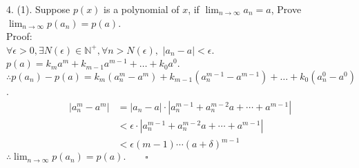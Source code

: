 4. (1). Suppose $ p(x) $ is a polynomial of $ x $, if $ \lim_{n\rightarrow\infty} a_n = a $, Prove $ \lim_{n\rightarrow\infty} p(a_n) = p(a) $.\\

Proof:\\
$ \forall \epsilon>0, \exists N(\epsilon) \in \mathbb{N}^+, \forall n>N(\epsilon), $
$ |a_n-a| <\epsilon $.\\
$ p(a) = k_{m}a^{m} + k_{m-1}a^{m-1} + \dots +  k_{0}a^{0} $.\\
$ \therefore p(a_n) - p(a) =  k_{m}(a_n^{m}-a^{m}) + k_{m-1}(a_n^{m-1}-a^{m-1}) + \dots +  k_{0}(a_n^{0}-a^{0}) $.
\begin{align*}
	|a_n^m - a^m| 
	&= |a_n-a|\cdot |a_n^{m-1} + a_n^{m-2}a + \cdots + a^{m-1}|\\
	&< \epsilon \cdot |a_n^{m-1} + a_n^{m-2}a + \cdots + a^{m-1}|\\
	&< \epsilon (m-1)\cdots(a+\delta)^{m-1}
\end{align*}
$ \therefore \lim_{n\rightarrow\infty} p(a_n) = p(a).\qquad\square  $  

